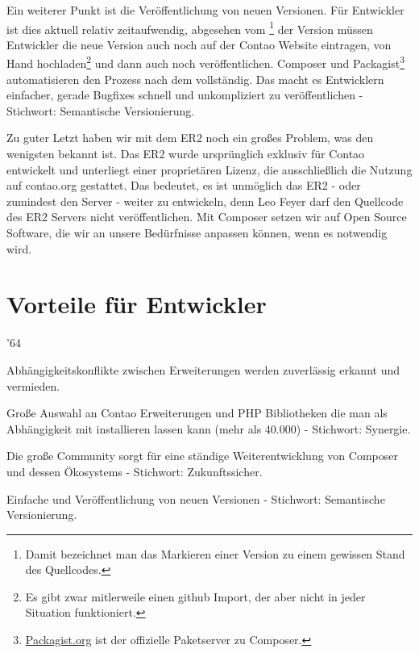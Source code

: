 \documentclass[
paper=a4,
draft=false,%
fontsize=10pt%
]{scrartcl}
\begin{document}
Ein weiterer Punkt ist die Veröffentlichung von neuen Versionen. Für Entwickler ist dies aktuell relativ zeitaufwendig, abgesehen vom \footnote{Damit bezeichnet man das Markieren einer Version zu einem gewissen Stand des Quellcodes.} der Version müssen Entwickler die neue Version auch noch auf der Contao Website eintragen, von Hand hochladen\footnote{Es gibt zwar mitlerweile einen github Import, der aber nicht in jeder Situation funktioniert.} und dann auch noch veröffentlichen. Composer und Packagist\footnote{\href{https://packagist.org}{Packagist.org} ist der offizielle Paketserver zu Composer.} automatisieren den Prozess nach dem  vollständig. Das macht es Entwicklern einfacher, gerade Bugfixes schnell und unkompliziert zu veröffentlichen - Stichwort: Semantische Versionierung.

Zu guter Letzt haben wir mit dem ER2 noch ein großes Problem, was den wenigsten bekannt ist. Das ER2 wurde ursprünglich exklusiv für Contao entwickelt und unterliegt einer proprietären Lizenz, die ausschließlich die Nutzung auf contao.org gestattet. Das bedeutet, es ist unmöglich das ER2 - oder zumindest den Server - weiter zu entwickeln, denn Leo Feyer darf den Quellcode des ER2 Servers nicht veröffentlichen. Mit Composer setzen wir auf Open Source Software, die wir an unsere Bedürfnisse anpassen können, wenn es notwendig wird.

\newpage

%
%

\section{Vorteile für Entwickler}
\label{sec:pros-for-developers}

\begin{minipage}{.02\linewidth}
\end{minipage}
\begin{minipage}{.98\linewidth}
  \begin{dinglist}{'64}
  \item Abhängigkeitskonflikte zwischen Erweiterungen werden zuverlässig erkannt und vermieden.
  \item Große Auswahl an Contao Erweiterungen und PHP Bibliotheken die man als Abhängigkeit mit installieren lassen kann (mehr als 40.000) - Stichwort: Synergie.
  \item Die große Community sorgt für eine ständige Weiterentwicklung von Composer und dessen Ökosystems - Stichwort: Zukunftssicher.
  \item Einfache und  Veröffentlichung von neuen Versionen - Stichwort: Semantische Versionierung.
  \end{dinglist}
\end{minipage}
\end{document}
